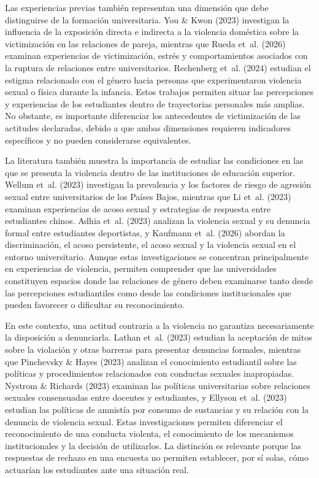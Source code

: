 \documentclass[
  spanish,
  11pt,
  letterpaper,
  DIV=11,
  numbers=noendperiod]{scrreprt}
\begin{document}
Las experiencias previas también representan una dimensión que debe
distinguirse de la formación universitaria. You \& Kwon (2023)
investigan la influencia de la exposición directa e indirecta a la
violencia doméstica sobre la victimización en las relaciones de pareja,
mientras que Rueda et~al. (2026) examinan experiencias de victimización,
estrés y comportamientos asociados con la ruptura de relaciones entre
universitarios. Rechenberg et~al. (2024) estudian el estigma relacionado
con el género hacia personas que experimentaron violencia sexual o
física durante la infancia. Estos trabajos permiten situar las
percepciones y experiencias de los estudiantes dentro de trayectorias
personales más amplias. No obstante, es importante diferenciar los
antecedentes de victimización de las actitudes declaradas, debido a que
ambas dimensiones requieren indicadores específicos y no pueden
considerarse equivalentes.

La literatura también muestra la importancia de estudiar las condiciones
en las que se presenta la violencia dentro de las instituciones de
educación superior. Wellum et~al. (2023) investigan la prevalencia y los
factores de riesgo de agresión sexual entre universitarios de los Países
Bajos, mientras que Li et~al. (2023) examinan experiencias de acoso
sexual y estrategias de respuesta entre estudiantes chinos. Adhia et~al.
(2023) analizan la violencia sexual y su denuncia formal entre
estudiantes deportistas, y Kaufmann et~al. (2026) abordan la
discriminación, el acoso persistente, el acoso sexual y la violencia
sexual en el entorno universitario. Aunque estas investigaciones se
concentran principalmente en experiencias de violencia, permiten
comprender que las universidades constituyen espacios donde las
relaciones de género deben examinarse tanto desde las percepciones
estudiantiles como desde las condiciones institucionales que pueden
favorecer o dificultar su reconocimiento.

En este contexto, una actitud contraria a la violencia no garantiza
necesariamente la disposición a denunciarla. Lathan et~al. (2023)
estudian la aceptación de mitos sobre la violación y otras barreras para
presentar denuncias formales, mientras que Pinchevsky \& Hayes (2023)
analizan el conocimiento estudiantil sobre las políticas y
procedimientos relacionados con conductas sexuales inapropiadas. Nystrom
\& Richards (2023) examinan las políticas universitarias sobre
relaciones sexuales consensuadas entre docentes y estudiantes, y Ellyson
et~al. (2023) estudian las políticas de amnistía por consumo de
sustancias y su relación con la denuncia de violencia sexual. Estas
investigaciones permiten diferenciar el reconocimiento de una conducta
violenta, el conocimiento de los mecanismos institucionales y la
decisión de utilizarlos. La distinción es relevante porque las
respuestas de rechazo en una encuesta no permiten establecer, por sí
solas, cómo actuarían los estudiantes ante una situación real.
\end{document}
